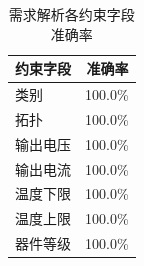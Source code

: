 \begin{table}[H]
\centering
\caption{需求解析各约束字段准确率}
\label{tab:parse_accuracy}
\small
\begin{tabular}{lr}
\toprule
\textbf{约束字段} & \textbf{准确率} \\
\midrule
    类别 & 100.0\% \\
    拓扑 & 100.0\% \\
    输出电压 & 100.0\% \\
    输出电流 & 100.0\% \\
    温度下限 & 100.0\% \\
    温度上限 & 100.0\% \\
    器件等级 & 100.0\% \\
\bottomrule
\end{tabular}
\end{table}